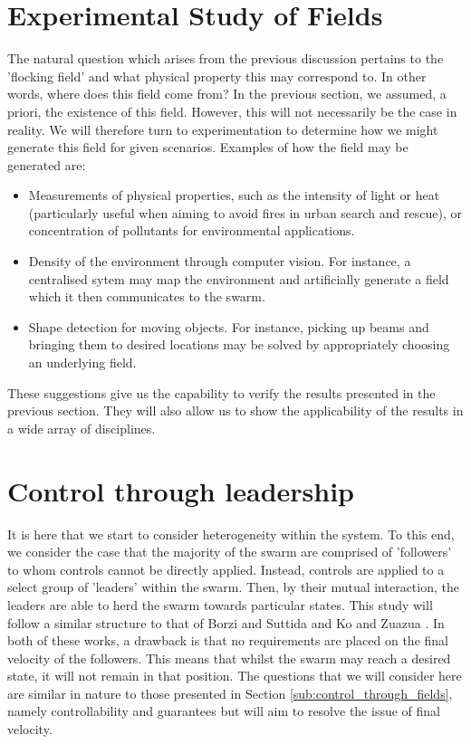 \documentclass[../sample.tex]{subfiles}
\begin{document}
	
	\section{Experimental Study of Fields} %
	\label{sec:experimental_study_of_fields}
	
	The natural question which arises from the previous discussion pertains to the 'flocking field' and
	what physical property this may correspond to. In other words, where does this field come from? In
	the previous section, we assumed, a priori, the existence of this field. However, this will not
	necessarily be the case in reality. We will therefore turn to experimentation to determine how we might
	generate this field for given scenarios. Examples of how the field may be generated are:

	\begin{itemize}
		\item Measurements of physical properties, such as the intensity of light or heat 
		(particularly useful when aiming to avoid fires in urban search and rescue), or
		concentration of pollutants for environmental applications.
		\item Density of the environment through computer vision. For instance, a centralised sytem may map the environment and artificially generate a field which it then communicates to the swarm.
		\item Shape detection for moving objects. For instance, picking up beams and bringing
		them to desired locations may be solved by appropriately choosing an underlying field.
	\end{itemize}

	These suggestions give us the capability to verify the results presented in the previous
	section. They will also allow us to show the applicability of the results in a wide array of
	disciplines.

	\section{Control through leadership} %
	\label{sec:control_through_leadership}
	
	It is here that we start to consider heterogeneity within the system. To this end, we consider the
	case that the majority of the swarm are comprised of 'followers' to whom controls cannot be
	directly applied. Instead, controls are applied to a select group of 'leaders' within the swarm.
	Then, by their mutual interaction, the leaders are able to herd the swarm towards particular
	states. This study will follow a similar structure to that of Borzi and Suttida  \cite{Borzi2015}
	and Ko and Zuazua \cite{Ko2019}. In both of these works, a drawback is that no requirements are
	placed on the final velocity of the followers. This means that whilst the swarm may reach a desired
	state, it will not remain in that position. The questions that we will consider here are similar in
	nature to those presented in Section \ref{sub:control_through_fields}, namely controllability and
	guarantees but will aim to resolve the issue of final velocity.
\end{document}
